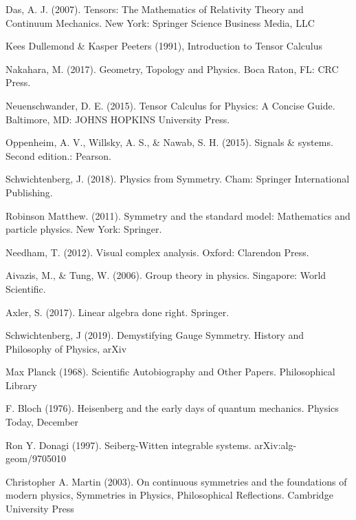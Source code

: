 \documentclass[a4paper,oneside,11pt, numbers=noenddot]{scrreprt}%
\begin{document}
\begin{thebibliography}{9}
	 Das, A. J. (2007). Tensors: The Mathematics of Relativity Theory and Continuum Mechanics. New York: Springer Science Business Media, LLC
	
	  Kees Dullemond \& Kasper Peeters (1991), Introduction to Tensor Calculus 
		
	 Nakahara, M. (2017). Geometry, Topology and Physics. Boca Raton, FL: CRC Press.
	
	 Neuenschwander, D. E. (2015). Tensor Calculus for Physics: A Concise Guide. Baltimore, MD: JOHNS HOPKINS University Press.
	
	  Oppenheim, A. V., Willsky, A. S., \& Nawab, S. H. (2015). Signals \& systems. Second edition.: Pearson.
    
     Schwichtenberg, J. (2018). Physics from Symmetry. Cham: Springer International Publishing.
    
    \bibitem{} Robinson Matthew. (2011). Symmetry and the standard model: Mathematics and particle physics. New York: Springer.
     
     Needham, T. (2012). Visual complex analysis. Oxford: Clarendon Press.
     
     Aivazis, M., \& Tung, W. (2006). Group theory in physics. Singapore: World Scientific.
	
    \bibitem{} Axler, S. (2017). Linear algebra done right. Springer.
    
    \bibitem{} Schwichtenberg, J (2019). Demystifying Gauge Symmetry. History and Philosophy of Physics, arXiv
    
    \bibitem{} Max Planck (1968). Scientific Autobiography and Other Papers. Philosophical Library

    \bibitem{} F. Bloch (1976). Heisenberg and the early days of quantum mechanics. Physics Today, December
    
    
    \bibitem {} Ron Y. Donagi (1997). Seiberg-Witten integrable systems. arXiv:alg-geom/9705010
    
    \bibitem {} Christopher A. Martin (2003).  On continuous symmetries and the foundations of modern physics, Symmetries in Physics, Philosophical Reflections. Cambridge University Press
\end{thebibliography}
\end{document}
